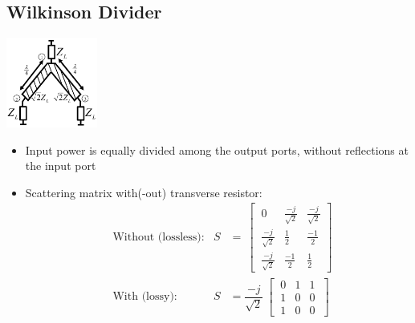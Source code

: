 \subsection{Wilkinson Divider}
\begin{center}
\includegraphics[width=3cm]{content/hfcomp/pictures/lossless_wilkinson_divider.png}
\end{center}
\begin{itemize}
    \itemsep0pt
    \item Input power is equally divided among the output ports, without reflections at the input port
    \item Scattering matrix with(-out) transverse resistor:
        \begin{align*}
            &\text{Without (lossless):} & S &= \
            \begin{bmatrix}\
                0 & \frac{-j}{\sqrt{2}} & \frac{-j}{\sqrt{2}}\\\
                \frac{-j}{\sqrt{2}} & \frac{1}{2} & \frac{-1}{2}\\\
                \frac{-j}{\sqrt{2}} & \frac{-1}{2} & \frac{1}{2}\
            \end{bmatrix}\\
            &\text{With (lossy):} & S &= \dfrac{-j}{\sqrt{2}}\
            \begin{bmatrix}\
                0 & 1 & 1\\\
                1 & 0 & 0\\\
                1 & 0 & 0\
            \end{bmatrix}\\
        \end{align*}
\end{itemize}

